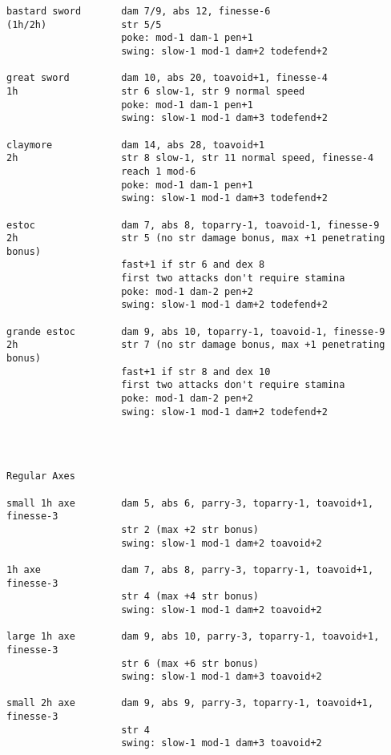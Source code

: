 \begin{verbatim}
bastard sword       dam 7/9, abs 12, finesse-6
(1h/2h)             str 5/5
                    poke: mod-1 dam-1 pen+1
                    swing: slow-1 mod-1 dam+2 todefend+2

great sword         dam 10, abs 20, toavoid+1, finesse-4
1h                  str 6 slow-1, str 9 normal speed
                    poke: mod-1 dam-1 pen+1
                    swing: slow-1 mod-1 dam+3 todefend+2

claymore            dam 14, abs 28, toavoid+1
2h                  str 8 slow-1, str 11 normal speed, finesse-4
                    reach 1 mod-6
                    poke: mod-1 dam-1 pen+1
                    swing: slow-1 mod-1 dam+3 todefend+2

estoc               dam 7, abs 8, toparry-1, toavoid-1, finesse-9
2h                  str 5 (no str damage bonus, max +1 penetrating bonus)
                    fast+1 if str 6 and dex 8
                    first two attacks don't require stamina
                    poke: mod-1 dam-2 pen+2
                    swing: slow-1 mod-1 dam+2 todefend+2

grande estoc        dam 9, abs 10, toparry-1, toavoid-1, finesse-9
2h                  str 7 (no str damage bonus, max +1 penetrating bonus)
                    fast+1 if str 8 and dex 10
                    first two attacks don't require stamina
                    poke: mod-1 dam-2 pen+2
                    swing: slow-1 mod-1 dam+2 todefend+2




\end{verbatim} \pagebreak[3] \begin{verbatim}
Regular Axes

small 1h axe        dam 5, abs 6, parry-3, toparry-1, toavoid+1, finesse-3
                    str 2 (max +2 str bonus)
                    swing: slow-1 mod-1 dam+2 toavoid+2

1h axe              dam 7, abs 8, parry-3, toparry-1, toavoid+1, finesse-3
                    str 4 (max +4 str bonus)
                    swing: slow-1 mod-1 dam+2 toavoid+2

large 1h axe        dam 9, abs 10, parry-3, toparry-1, toavoid+1, finesse-3
                    str 6 (max +6 str bonus)
                    swing: slow-1 mod-1 dam+3 toavoid+2

small 2h axe        dam 9, abs 9, parry-3, toparry-1, toavoid+1, finesse-3
                    str 4
                    swing: slow-1 mod-1 dam+3 toavoid+2


\end{verbatim}
